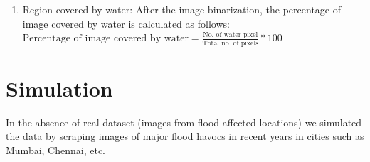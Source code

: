 \documentclass[12pt]{article}
\begin{document}
\begin{enumerate}
We also used the Otsu Algorithm for the image binarization.
Otsu’s algorithm is a simple and popular thresholding method for image binarization.The algorithm divides the image histogram into two classes, by using a threshold such that the in-class variability is very small. This way, each class will be as compact as possible. \\\\
Formally, a function g(x, y) can be defined over every pixel value of the original image f(x, y) that defines the new threshold image.\\
	\begin{equation}
	g(x, y)  =
		\begin{cases}
      	0, & \text{if}\ x<T \\
      	1, & \text{if}\ x \geq T \\
    	\end{cases}
	\end{equation}
where,
$T \rightarrow Threshold$\\
\item Region covered by water: After the image binarization, the percentage of image covered by water is calculated as follows:\\
$\displaystyle{\text{Percentage of image covered by water} = \frac{\text{No. of water pixel}}{\text{Total no. of pixels}}*100}$
\end{enumerate}
\section{Simulation}
In the absence of real dataset (images from flood affected locations) we simulated the data by scraping images of major flood havocs in recent years in cities such as Mumbai, Chennai, etc.\\
\end{document}
